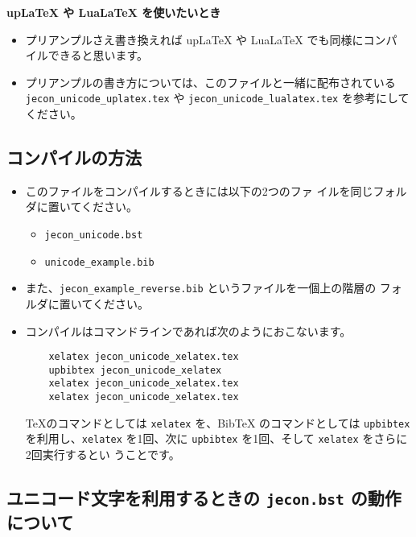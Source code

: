 \documentclass[a4paper,10pt]{bxjsarticle}
\begin{document}
\vspace*{1em}

\textbf{upLaTeX や LuaLaTeX を使いたいとき}
\begin{itemize}
	\item プリアンプルさえ書き換えれば upLaTeX や LuaLaTeX でも同様にコンパ
	      イルできると思います。
	\item プリアンプルの書き方については、このファイルと一緒に配布されている
	      \texttt{jecon\_unicode\_uplatex.tex} や
	      \texttt{jecon\_unicode\_lualatex.tex} を参考にしてください。
\end{itemize}

\subsection{コンパイルの方法}

\begin{itemize}
 \item このファイルをコンパイルするときには以下の2つのファ
       イルを同じフォルダに置いてください。
       \begin{itemize}
	\item \texttt{jecon\_unicode.bst}
	\item \texttt{unicode\_example.bib}
       \end{itemize}
 \item また、\texttt{jecon\_example\_reverse.bib} というファイルを一個上の階層の
       フォルダに置いてください。
 \item コンパイルはコマンドラインであれば次のようにおこないます。
\begin{verbatim}
    xelatex jecon_unicode_xelatex.tex
    upbibtex jecon_unicode_xelatex
    xelatex jecon_unicode_xelatex.tex               
    xelatex jecon_unicode_xelatex.tex
\end{verbatim}
       \TeX のコマンドとしては \texttt{xelatex} を、BibTeX のコマンドとしては
       \texttt{upbibtex} を利用し、\texttt{xelatex} を1回、次に
       \texttt{upbibtex} を1回、そして \texttt{xelatex} をさらに2回実行するとい
       うことです。
\end{itemize}

\subsection{ユニコード文字を利用するときの \texttt{jecon.bst} の動作について}
\end{document}
